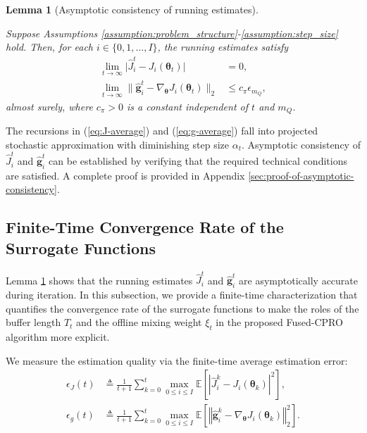 \documentclass{IEEEtran}
\newtheorem{lemma}{Lemma}
\begin{document}
\begin{lemma}[Asymptotic consistency of running estimates]~

\label{lemma-asymptotic-consistency}

Suppose Assumptions \ref{assumption:problem_structure}-\ref{assumption:step_size} hold. Then, for each $i\in\{0,1,\ldots,I\}$, the running estimates satisfy
\begin{align}
\lim_{t\rightarrow\infty}\bigl|\hat{J}_{i}^{t}-J_{i}(\boldsymbol{\theta}_{t})\bigr| & =0,\\
\lim_{t\rightarrow\infty}\bigl\|\hat{\boldsymbol{g}}_{i}^{t}-\nabla_{\boldsymbol{\theta}}J_{i}(\boldsymbol{\theta}_{t})\bigr\|_{2} & \leq c_{\pi}\epsilon_{m_{Q}},
\end{align}
almost surely, where $c_{\pi}>0$ is a constant independent of $t$ and $m_{Q}$.

\end{lemma}

\begin{IEEEproof}
The recursions in (\ref{eq:J-average}) and (\ref{eq:g-average}) fall into projected stochastic approximation with diminishing step size $\alpha_{t}$. Asymptotic consistency of $\hat{J}_{i}^{t}$ and $\hat{\boldsymbol{g}}_{i}^{t}$ can be established by verifying that the required technical conditions are satisfied. A complete proof is provided in Appendix \ref{sec:proof-of-asymptotic-consistency}.

\end{IEEEproof}

\subsection{Finite-Time Convergence Rate of the Surrogate Functions}
Lemma \ref{lemma-asymptotic-consistency} shows that the running estimates $\hat{J}_{i}^{t}$ and $\hat{\boldsymbol{g}}_{i}^{t}$ are asymptotically accurate during iteration. In this subsection, we provide a finite-time characterization that quantifies the convergence rate of the surrogate functions to make the roles of the buffer length $T_{t}$ and the offline mixing weight $\xi_{t}$ in the proposed Fused-CPRO algorithm more explicit.

We measure the estimation quality via the finite-time average estimation error:
\begin{align}
\epsilon_{J}(t) & \triangleq\frac{1}{t+1}\sum_{k=0}^{t}\max_{0\le i\le I}\mathbb{E}\!\left[\left|\hat{J}_{i}^{k}-J_{i}(\boldsymbol{\theta}_{k})\right|^{2}\right],\label{eq:epsJ_def}\\
\epsilon_{g}(t) & \triangleq\frac{1}{t+1}\sum_{k=0}^{t}\max_{0\le i\le I}\mathbb{E}\!\left[\left\Vert \hat{\boldsymbol{g}}_{i}^{k}-\nabla_{\boldsymbol{\theta}}J_{i}(\boldsymbol{\theta}_{k})\right\Vert _{2}^{2}\right].\label{eq:epsg_def}
\end{align}
\end{document}
